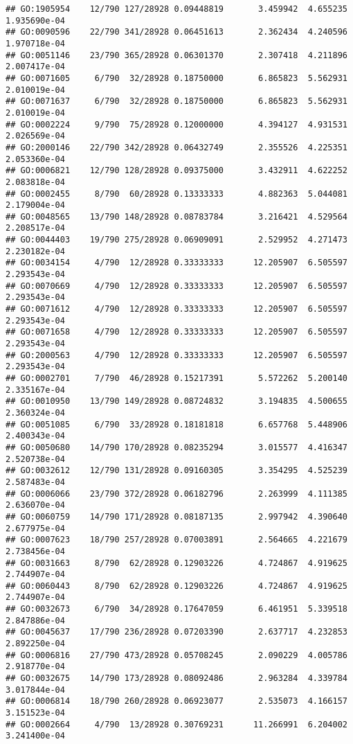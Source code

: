 \documentclass[
]{article}
\begin{document}
\begin{verbatim}
## GO:1905954    12/790 127/28928 0.09448819       3.459942  4.655235 1.935690e-04
## GO:0090596    22/790 341/28928 0.06451613       2.362434  4.240596 1.970718e-04
## GO:0051146    23/790 365/28928 0.06301370       2.307418  4.211896 2.007417e-04
## GO:0071605     6/790  32/28928 0.18750000       6.865823  5.562931 2.010019e-04
## GO:0071637     6/790  32/28928 0.18750000       6.865823  5.562931 2.010019e-04
## GO:0002224     9/790  75/28928 0.12000000       4.394127  4.931531 2.026569e-04
## GO:2000146    22/790 342/28928 0.06432749       2.355526  4.225351 2.053360e-04
## GO:0006821    12/790 128/28928 0.09375000       3.432911  4.622252 2.083818e-04
## GO:0002455     8/790  60/28928 0.13333333       4.882363  5.044081 2.179004e-04
## GO:0048565    13/790 148/28928 0.08783784       3.216421  4.529564 2.208517e-04
## GO:0044403    19/790 275/28928 0.06909091       2.529952  4.271473 2.230182e-04
## GO:0034154     4/790  12/28928 0.33333333      12.205907  6.505597 2.293543e-04
## GO:0070669     4/790  12/28928 0.33333333      12.205907  6.505597 2.293543e-04
## GO:0071612     4/790  12/28928 0.33333333      12.205907  6.505597 2.293543e-04
## GO:0071658     4/790  12/28928 0.33333333      12.205907  6.505597 2.293543e-04
## GO:2000563     4/790  12/28928 0.33333333      12.205907  6.505597 2.293543e-04
## GO:0002701     7/790  46/28928 0.15217391       5.572262  5.200140 2.335167e-04
## GO:0010950    13/790 149/28928 0.08724832       3.194835  4.500655 2.360324e-04
## GO:0051085     6/790  33/28928 0.18181818       6.657768  5.448906 2.400343e-04
## GO:0050680    14/790 170/28928 0.08235294       3.015577  4.416347 2.520738e-04
## GO:0032612    12/790 131/28928 0.09160305       3.354295  4.525239 2.587483e-04
## GO:0006066    23/790 372/28928 0.06182796       2.263999  4.111385 2.636070e-04
## GO:0060759    14/790 171/28928 0.08187135       2.997942  4.390640 2.677975e-04
## GO:0007623    18/790 257/28928 0.07003891       2.564665  4.221679 2.738456e-04
## GO:0031663     8/790  62/28928 0.12903226       4.724867  4.919625 2.744907e-04
## GO:0060443     8/790  62/28928 0.12903226       4.724867  4.919625 2.744907e-04
## GO:0032673     6/790  34/28928 0.17647059       6.461951  5.339518 2.847886e-04
## GO:0045637    17/790 236/28928 0.07203390       2.637717  4.232853 2.892250e-04
## GO:0006816    27/790 473/28928 0.05708245       2.090229  4.005786 2.918770e-04
## GO:0032675    14/790 173/28928 0.08092486       2.963284  4.339784 3.017844e-04
## GO:0006814    18/790 260/28928 0.06923077       2.535073  4.166157 3.151523e-04
## GO:0002664     4/790  13/28928 0.30769231      11.266991  6.204002 3.241400e-04

\end{verbatim}
\end{document}
